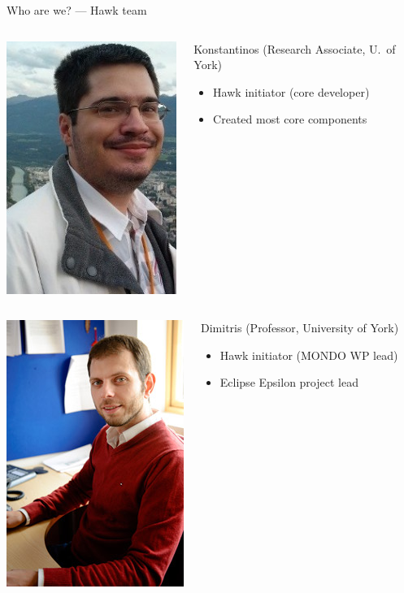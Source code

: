 \begin{frame}{Who are we? --- Hawk team}
\begin{columns}
\centering
\includegraphics[height=.25\textheight,clip,trim={0 3cm 0 0}]{biopic-02-konstantinos}
\begin{block}{Konstantinos (Research Associate, U.\ of York)}
\begin{itemize}
\item Hawk initiator (core developer)
\item Created most core components
\end{itemize}
\end{block}
\end{columns}

\begin{columns}
\centering
\includegraphics[height=.25\textheight,clip,trim={0 4cm 0 0}]{biopic-03-dimitris}
\centering
\begin{block}{Dimitris (Professor, University of York)}
\begin{itemize}
\item Hawk initiator (MONDO WP lead)
\item Eclipse Epsilon project lead
\end{itemize}
\end{block}
\end{columns}

\end{frame}

